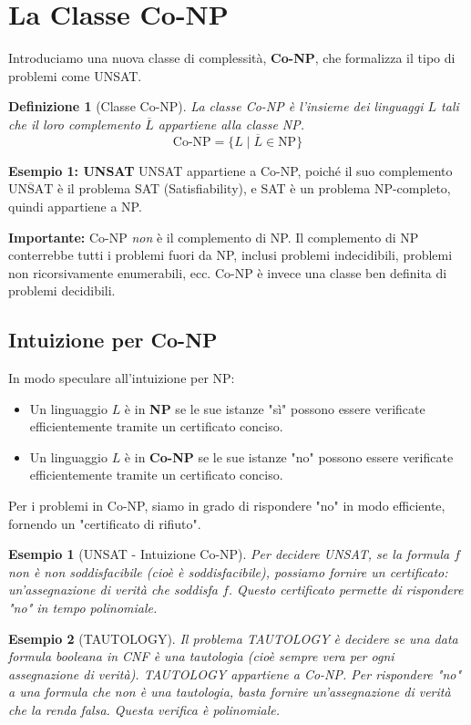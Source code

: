 \documentclass[a4paper]{article}
\newtheorem{definition}{Definizione}
\newtheorem{example}{Esempio}
\begin{document}
\section{La Classe Co-NP}

Introduciamo una nuova classe di complessità, \textbf{Co-NP}, che formalizza il tipo di problemi come UNSAT.

\begin{definition}[Classe Co-NP]
La classe Co-NP è l'insieme dei linguaggi $L$ tali che il loro complemento $\overline{L}$ appartiene alla classe NP.
\[
\text{Co-NP} = \{ L \mid \overline{L} \in \text{NP} \}
\]
\end{definition}

\textbf{Esempio 1: UNSAT}
UNSAT appartiene a Co-NP, poiché il suo complemento $\overline{\text{UNSAT}}$ è il problema SAT (Satisfiability), e SAT è un problema NP-completo, quindi appartiene a NP.

\textbf{Importante:} Co-NP \textit{non} è il complemento di NP. Il complemento di NP conterrebbe tutti i problemi fuori da NP, inclusi problemi indecidibili, problemi non ricorsivamente enumerabili, ecc. Co-NP è invece una classe ben definita di problemi decidibili.

\subsection{Intuizione per Co-NP}
In modo speculare all'intuizione per NP:
\begin{itemize}
    \item Un linguaggio $L$ è in \textbf{NP} se le sue istanze "sì" possono essere verificate efficientemente tramite un certificato conciso.
    \item Un linguaggio $L$ è in \textbf{Co-NP} se le sue istanze "no" possono essere verificate efficientemente tramite un certificato conciso.
\end{itemize}
Per i problemi in Co-NP, siamo in grado di rispondere "no" in modo efficiente, fornendo un "certificato di rifiuto".

\begin{example}[UNSAT - Intuizione Co-NP]
Per decidere UNSAT, se la formula $f$ \textit{non è} non soddisfacibile (cioè è soddisfacibile), possiamo fornire un certificato: un'assegnazione di verità che soddisfa $f$. Questo certificato permette di rispondere "no" in tempo polinomiale.
\end{example}

\begin{example}[TAUTOLOGY]
Il problema TAUTOLOGY è decidere se una data formula booleana in CNF è una tautologia (cioè sempre vera per ogni assegnazione di verità).
TAUTOLOGY appartiene a Co-NP. Per rispondere "no" a una formula che \textit{non è} una tautologia, basta fornire un'assegnazione di verità che la renda falsa. Questa verifica è polinomiale.
\end{example}
\end{document}

